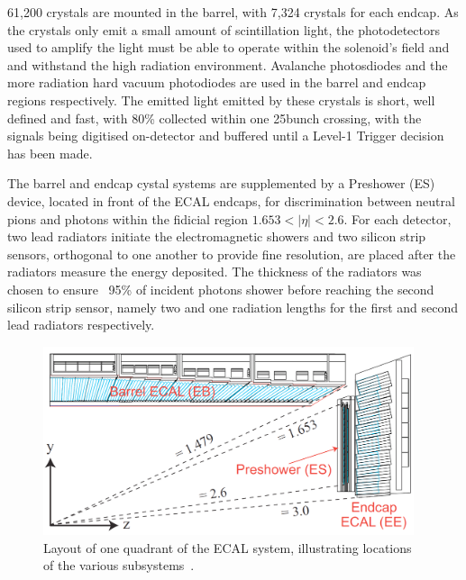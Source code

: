 61,200 crystals are mounted in the barrel, with 7,324 crystals for each endcap.
As the crystals only emit a small amount of scintillation light, the photodetectors used to amplify the light must be able to operate within the solenoid's field and and withstand the high radiation environment.
Avalanche photosdiodes and the more radiation hard vacuum photodiodes are used in the barrel and endcap regions respectively.
The emitted light emitted by these crystals is short, well defined and fast, with 80\% collected within one 25\ns bunch crossing, with the signals being digitised on-detector and buffered until a Level-1 Trigger decision has been made.

The barrel and endcap cystal systems are supplemented by a Preshower (ES)~\cite{Loos:539819} device, located in front of the ECAL endcaps, for discrimination between neutral pions and photons within the fidicial region $1.653 < |\eta| < 2.6$.
For each detector, two lead radiators initiate the electromagnetic showers and two silicon strip sensors, orthogonal to one another to provide fine resolution, are placed after the radiators measure the energy deposited.
The thickness of the radiators was chosen to ensure ~95\% of incident photons shower before reaching the second silicon strip sensor, namely two and one radiation lengths for the first and second lead radiators respectively.

\begin{figure}[htbp]
\begin{center}
\includegraphics[width=0.97\textwidth]{figs/cms/ECAL.png}
\caption{Layout of one quadrant of the ECAL system, illustrating locations of the various subsystems~\cite{Bayatian:2006nff}.}
\label{fig:muonChambers}
\end{center}
\end{figure}


